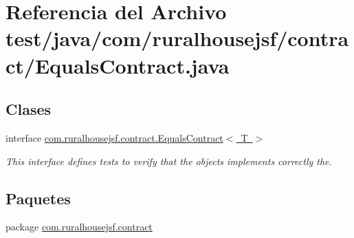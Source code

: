 \hypertarget{a00086}{}\section{Referencia del Archivo test/java/com/ruralhousejsf/contract/\+Equals\+Contract.java}
\label{a00086}
\subsection*{Clases}
\begin{DoxyCompactItemize}
\item 
interface \mbox{\hyperlink{a00240}{com.\+ruralhousejsf.\+contract.\+Equals\+Contract$<$ T $>$}}
\begin{DoxyCompactList}\small\item\em This interface defines tests to verify that the objects implements correctly the. \end{DoxyCompactList}\end{DoxyCompactItemize}
\subsection*{Paquetes}
\begin{DoxyCompactItemize}
\item 
package \mbox{\hyperlink{a00123}{com.\+ruralhousejsf.\+contract}}
\end{DoxyCompactItemize}

